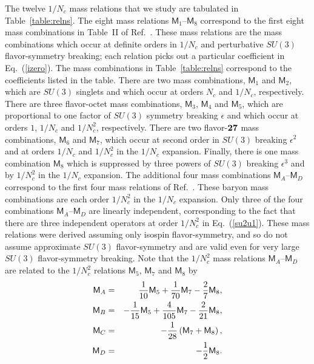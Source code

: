 \documentclass[twocolumn,nofootinbib,prd,aps,superscriptaddress,tightenlines]{revtex4}
\def\mreln{ \mathsf{M} }
\begin{document}
The twelve $1/N_c$ mass relations that we study are tabulated in Table~\ref{table:relns}. The eight mass relations $\mreln_1$--$\mreln_8$ correspond to the first eight mass combinations in Table~II of Ref.~\cite{jl}.  These mass relations are the mass combinations which occur at definite orders in $1/N_c$ and perturbative $SU(3)$ flavor-symmetry breaking; each relation picks out a particular coefficient in Eq.~(\ref{izero}).  The mass combinations in Table~\ref{table:relns} correspond to the coefficients listed in the table.  There are two mass combinations, $\mreln_1$ and $\mreln_2$, which are $SU(3)$ singlets and which occur at orders $N_c$ and $1/N_c$, respectively.
There are three flavor-octet mass combinations, $\mreln_3$, $\mreln_4$ and $\mreln_5$, which are proportional
to one factor of $SU(3)$ symmetry breaking $\epsilon$ and which occur at orders $1$, $1/N_c$ and $1/N_c^2$, respectively.  There are two flavor-$\bf 27$ mass combinations, $\mreln_6$ and $\mreln_7$, which occur at second order in $SU(3)$ breaking $\epsilon^2$ and at orders $1/N_c$ and $1/N_c^2$ in the $1/N_c$ expansion.  Finally, there is one mass combination $\mreln_8$ which is suppressed by three powers of $SU(3)$ breaking $\epsilon^3$ and by $1/N_c^2$ in the $1/N_c$ expansion.  The additional four mass combinations $\mreln_A$--$\mreln_D$ correspond to the first four mass relations of Ref.~\cite{djm1}.  These baryon mass combinations are each order $1/N_c^2$ in the $1/N_c$ expansion.  Only three of the four combinations $\mreln_A$--$\mreln_D$ are linearly independent, corresponding to the fact that there are three independent operators at order $1/N_c^2$ in Eq.~(\ref{su2u1}).
These mass relations were derived assuming only isospin flavor-symmetry, and so do not assume approximate $SU(3)$ flavor-symmetry and are valid even for very large $SU(3)$ flavor-symmetry breaking.  Note that the $1/N_c^2$ mass relations $\mreln_A$--$\mreln_D$ are related to the $1/N_c^2$ relations $\mreln_5$, $\mreln_7$ and $\mreln_8$ by
\begin{eqnarray}\label{mam5}
\mreln_A &=& {1 \over {10}} \mreln_5 + {1 \over {70}} \mreln_7 - {2 \over 7} \mreln_8, \nonumber \\
\mreln_B &=& - { 1 \over {15}} \mreln_5 + {4 \over {105}} \mreln_7 - {2 \over {21}} \mreln_8, \nonumber \\
\mreln_C &=& -{1 \over {28}} \left( \mreln_7 + \mreln_8 \right), \nonumber \\
\mreln_D &=& -{1 \over 2} \mreln_8 .
\end{eqnarray}   
\end{document}
